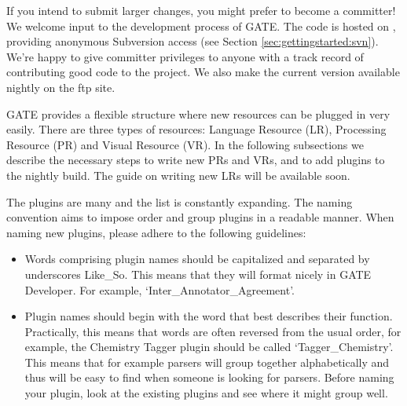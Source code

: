 If you intend to submit larger changes, you might prefer to become a committer!
We welcome input to the development process of GATE. The code is hosted on
, providing anonymous
Subversion access (see Section \ref{sec:gettingstarted:svn}). We're happy to
give committer privileges to anyone with a track record of contributing good
code to the project. We also make the current version available nightly on the
ftp site.


GATE provides a flexible structure where new resources can be plugged in very
easily. There are three types of resources: Language Resource (LR), Processing
Resource (PR) and Visual Resource (VR). In the following subsections we describe
the necessary steps to write new PRs and VRs, and to add plugins to the nightly
build. The guide on writing new LRs will be available soon.


The plugins are many and the list is constantly expanding. The naming convention
aims to impose order and group plugins in a readable manner. When naming new
plugins, please adhere to the following guidelines:

\begin{itemize}

\item Words comprising plugin names should be capitalized and separated by
underscores Like\_So. This means that they will format nicely in GATE
Developer. For example, `Inter\_Annotator\_Agreement'.

\item Plugin names should begin with the word that best describes their function.
Practically, this means that words are often reversed from the usual order, for
example, the Chemistry Tagger plugin should be called `Tagger\_Chemistry'. This
means that for example parsers will group together alphabetically and thus will
be easy to find when someone is looking for parsers. Before naming your plugin,
look at the existing plugins and see where it might group well.

\end{itemize}


